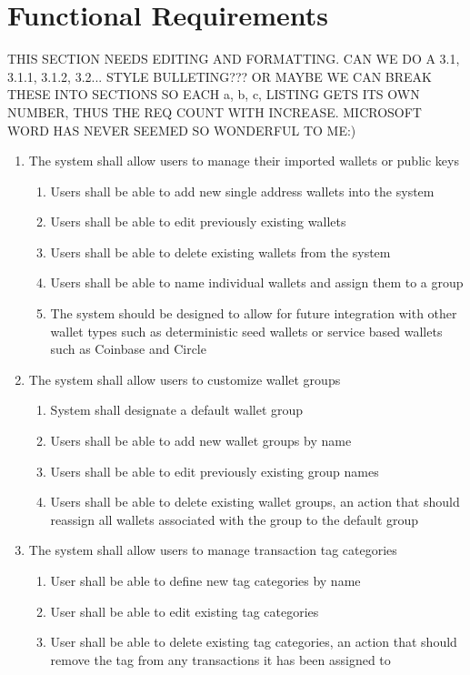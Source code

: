 \section{Functional Requirements}
\begin{adjustwidth}{1.5em}{0pt}

	THIS SECTION NEEDS EDITING AND FORMATTING. CAN WE DO A 3.1, 3.1.1, 3.1.2, 3.2... STYLE BULLETING??? OR MAYBE WE CAN BREAK THESE INTO SECTIONS SO EACH a, b, c, LISTING GETS ITS OWN NUMBER, THUS THE REQ COUNT WITH INCREASE. MICROSOFT WORD HAS NEVER SEEMED SO WONDERFUL TO ME:)\\

	\begin{enumerate}
	
		\item The system shall allow users to manage their imported wallets or public keys
		\begin{enumerate}
			\item Users shall be able to add new single address wallets into the system
			\item Users shall be able to edit previously existing wallets
			\item Users shall be able to delete existing wallets from the system
			\item Users shall be able to name individual wallets and assign them to a group
			\item The system should be designed to allow for future integration with other wallet types such as deterministic seed wallets or service based wallets such as Coinbase and Circle
		\end{enumerate}
		
		\item The system shall allow users to customize wallet groups
		\begin{enumerate}
			\item System shall designate a default wallet group
			\item Users shall be able to add new wallet groups by name
			\item Users shall be able to edit previously existing group names
			\item Users shall be able to delete existing wallet groups, an action that should reassign all wallets associated with the group to the default group
		\end{enumerate}
		
		\item The system shall allow users to manage transaction tag categories
		\begin{enumerate}
			\item User shall be able to define new tag categories by name
			\item User shall be able to edit existing tag categories
			\item User shall be able to delete existing tag categories, an action that should remove the tag from any transactions it has been assigned to
		\end{enumerate}
		

\end{enumerate}
\end{adjustwidth}
